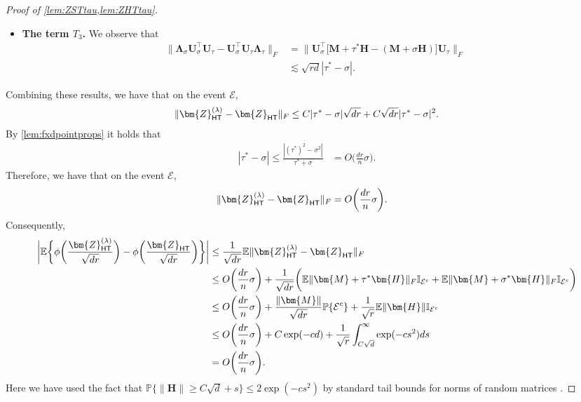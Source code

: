 \documentclass[10pt]{article}
\newcommand{\s}{^*}
\renewcommand{\t}{^{\top}}
\newcommand{\p}{\mathbb{P}}
\theoremstyle{definition}
\begin{document}
\begin{proof}[Proof of \cref{lem:ZSTtau,lem:ZHTtau}]
\begin{itemize}
    \begin{align}
   \| \bm{\Lambda}_{\sigma}\big[ \mathcal{O}_{\bm{U}_{\tau},\bm{U}_{\sigma}}\t - \bm{U}_{\sigma}\t \bm{U}_{\tau} \big] \|_F &\leq \| \bm{\Lambda}_{\sigma} \| C^2 \frac{|\tau\s - \sigma |^2 dr}{\lambda_r^2(\bm{M})} \leq C'  |\tau\s - \sigma |^2 \sqrt{dr} \frac{\sqrt{dr}}{\lambda_{r}(\bm{M})},
    \end{align}
    which follows by \cref{ass1}.  A similar bound holds for the other quantity.
    \item \textbf{The term $T_3$.} We observe that  
    \begin{align*}
        \| \bm{\Lambda}_{\sigma} \bm{U}_{\sigma}\t \bm{U}_{\tau} - \bm{U}_{\sigma}\t \bm{U}_{\tau} \bm{\Lambda}_{\tau} \|_F &= \| \bm{U}_{\sigma}\t \big[ \bm{M} + \tau\s \bm{H} - ( \bm{M} + \sigma \bm{H}) \big] \bm{U}_{\tau} \|_F \\
        &\lesssim \sqrt{rd} | \tau\s - \sigma|.
    \end{align*}
\end{itemize}
Combining these results, we have that on the event $\mathcal{E}$,
\begin{align*}
    \| \bm{Z}_{{\sf HT}}^{(\lambda)} - \bm{Z}_{{\sf HT}} \|_F \leq C | \tau\s - \sigma | \sqrt{dr} + C \sqrt{dr} | \tau\s - \sigma |^2.
\end{align*}
By \cref{lem:fxdpointprops} it holds that 
\begin{align*}
    |\tau\s - \sigma| \leq \frac{|(\tau\s)^2 - \sigma^2|}{\tau\s + \sigma} &= O\bigg( \frac{dr}{n} \sigma \bigg).
\end{align*}
Therefore, we have that  on the event $\mathcal{E}$,
\begin{align*}
    \| \bm{Z}_{{\sf HT}}^{(\lambda)} - \bm{Z}_{{\sf HT}} \|_F &= O \bigg( \frac{dr}{n} \sigma \bigg).
\end{align*}
Consequently,
 \begin{align}
 \bigg|        \mathbb{E}\bigg\{ \phi\bigg( \frac{\bm{Z}_{{\sf HT}}^{(\lambda)}}{\sqrt{dr}} \bigg) - \phi \bigg( \frac{\bm{Z}_{{\sf HT}}}{\sqrt{dr}} \bigg) \bigg\} \bigg| &\leq \frac{1}{\sqrt{dr}}\mathbb{E} \| \bm{Z}_{{\sf HT}}^{(\lambda)} - \bm{Z}_{{\sf HT}} \|_F \\
 &\leq O\bigg( \frac{dr}{n} \sigma \bigg) + \frac{1}{\sqrt{dr}} \bigg( \mathbb{E}  \| \bm{M} + \tau\s \bm{H} \|_F \mathbb{I}_{\mathcal{E}^c}  + \mathbb{E}  \| \bm{M} + \sigma\s \bm{H} \|_F \mathbb{I}_{\mathcal{E}^c} \bigg)\\ 
 &\leq O \bigg( \frac{dr}{n} \sigma \bigg) + \frac{\| \bm{M} \|}{\sqrt{dr}} \p\{ \mathcal{E}^c \} +  \frac{1}{\sqrt{r}} \mathbb{E} \| \bm{H} \| \mathbb{I}_{\mathcal{E}^c} \\
 &\leq O\bigg( \frac{dr}{n} \sigma \bigg) + C \exp( - c d) + \frac{1}{\sqrt{r}} \int_{C\sqrt{d}}^{\infty} \exp( - c s^2) ds \\
 &= O\bigg( \frac{dr}{n} \sigma \bigg).
 \end{align}
 Here we have used the fact that $\p\{ \|\bm{H}\| \geq C \sqrt{d} + s \} \leq 2 \exp( - c s^2)$ by standard tail bounds for norms of random matrices \citep{bandeira_sharp_2016}.  


\end{proof}
\end{document}
